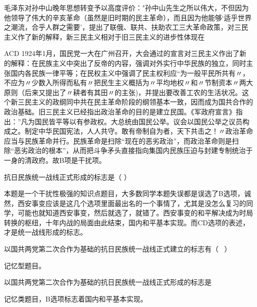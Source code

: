 \question 毛泽东对孙中山晚年思想转变予以高度评价："孙中山先生之所以伟大，不但因为他领导了伟大的辛亥革命（虽然是旧时期的民主革命），而且因为他能够`适乎世界之潮流，合乎人群之需要'，提出了联俄、联共、扶助农工三大革命政策，对三民主义作了新的解释，新三民主义相对于旧三民主义的进步性体现在
\par{}
\begin{solution}ACD
1924年1月，国民党一大在广州召开，大会通过的宣言对三民主义作出了新的解释：在民族主义中突出了反帝的内容，强调对外实行中华民族的独立，同时主张国内各民族一律平等；在民权主义中强调了民主权利应``为一般平民所共有〃，不应为〃少数入所得而私有〃把民生主义概括为〃平均地权〃和〃节制资本〃两大原则（后来又提出了〃耕者有其田〃的主张)，并提出要改善工农的生活状况。这个新三民主义的政纲同中共在民主革命阶段的纲领基本一致，因而成为国共合作的政治基础。旧三民主义已经指出政治革命的目的是建立民国。《军政府宣言》指出：''凡为国民皆平等以有参政权。大总统由国民公举。议会以国民公举之议员构成之。制定中华民国宪法，人人共守。敢有帝制自为者，天下共击之！〃政治革命应当与民族革命并行。民族革命是扫除``现在的恶劣政治''，而政治革命则是扫除``恶劣政治的根本''，从而把斗争矛头直接指向集国内民族压迫与封建专制统治于一身的清政府。故B项是干扰项。
\end{solution}
\question 抗日民族统一战线正式形成的标志是（ ）
\par{}
\begin{solution}本题是一个干扰性极强的知识点题目，大多数同学本题失误都是误选了B选项，诚然，西安事变应该是这几个选项里面最出名的一个事情了，尤其是没怎么复习的同学，可能也就知道西安事变，然后就选了，就错了。西安事变的和平解决成为时局转换的枢纽，十年内战的局面由此结束，国内和平基本实现。而CD选项的表述，才是统一战线形成的标志。
\end{solution}
\question 以国共两党第二次合作为基础的抗日民族统一战线正式建立的标志有（ ~）
\par{}
\begin{solution}记忆型题目。
\end{solution}
\question 以国共两党第二次合作为基础的抗日民族统一战线正式形成的标志是
\par{}
\begin{solution}记忆类题目，B选项标志着国内和平基本实现。
\end{solution}
